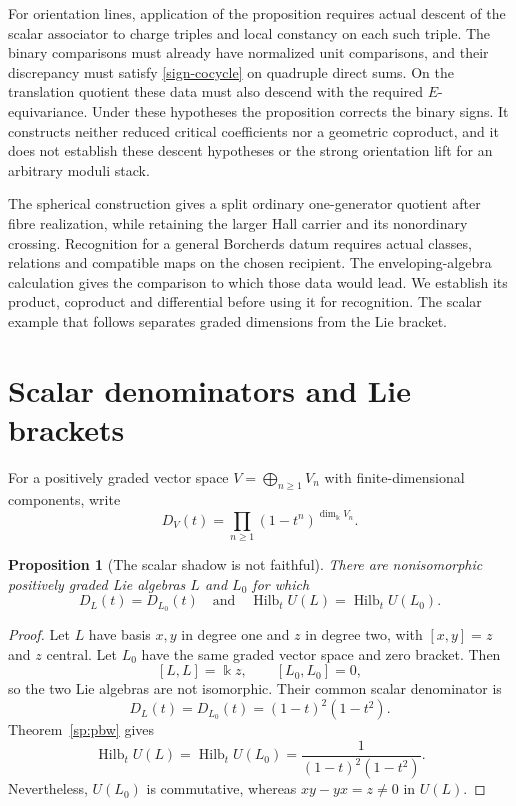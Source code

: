 \documentclass[11pt]{article}
\newtheorem{proposition}[theorem]{Proposition}
\newcommand{\kk}{\Bbbk}
\begin{document}
For orientation lines, application of the proposition requires actual
descent of the scalar associator to charge triples and local constancy
on each such triple. The binary comparisons must already have normalized
unit comparisons, and their discrepancy must satisfy
\eqref{sign-cocycle} on quadruple direct sums. On the translation quotient
these data must also descend with the required $E$-equivariance.
Under these hypotheses the proposition corrects the binary signs.
It constructs neither reduced critical coefficients nor a geometric
coproduct, and it does not establish these descent hypotheses or the
strong orientation lift for an arbitrary moduli stack.








The spherical construction gives a split ordinary one-generator quotient
after fibre realization, while retaining the larger Hall carrier and
its nonordinary crossing. Recognition for a general Borcherds datum
requires actual classes, relations and compatible maps on the chosen
recipient. The enveloping-algebra calculation gives the comparison to
which those data would lead. We establish its product, coproduct and
differential before using it for recognition. The scalar example that
follows separates graded dimensions from the Lie bracket.



\section{Scalar denominators and Lie brackets}

For a positively graded vector space $V=\bigoplus_{n\geq1}V_n$ with finite-dimensional
components, write
\[
 D_V(t)=\prod_{n\geq1}(1-t^n)^{\dim_\kk V_n}.
\]

\begin{proposition}[The scalar shadow is not faithful]\label{scalar-not-faithful}
There are nonisomorphic positively graded Lie algebras $L$ and $L_0$ for
which
\[
 D_L(t)=D_{L_0}(t)
 \quad\text{and}\quad
 \operatorname{Hilb}_t U(L)=\operatorname{Hilb}_t U(L_0).
\]
\end{proposition}

\begin{proof}
Let $L$ have basis $x,y$ in degree one and $z$ in degree two, with
$[x,y]=z$ and $z$ central.  Let $L_0$ have the same graded vector space and
zero bracket.  Then
\[
 [L,L]=\kk z,\qquad [L_0,L_0]=0,
\]
so the two Lie algebras are not isomorphic.  Their common scalar
denominator is
\[
 D_L(t)=D_{L_0}(t)=(1-t)^2(1-t^2).
\]
Theorem~\ref{sp:pbw} gives
\[
 \operatorname{Hilb}_t U(L)
 =\operatorname{Hilb}_t U(L_0)
 =\frac{1}{(1-t)^2(1-t^2)}.
\]
Nevertheless, $U(L_0)$ is commutative, whereas $xy-yx=z\neq0$ in $U(L)$.
\end{proof}
\end{document}
